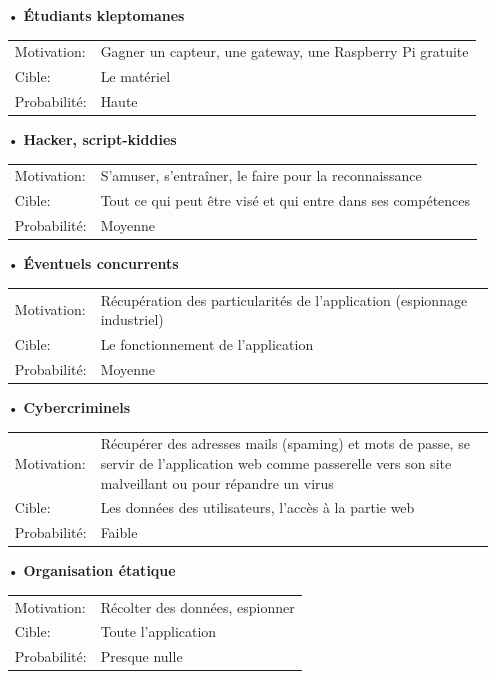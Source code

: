 \documentclass[12pt]{article}
\begin{document}
\begin{itemize}

\item[•] \textbf{Étudiants kleptomanes}

\begin{tabular}{lp{13cm}}
Motivation: & Gagner un capteur, une gateway, une Raspberry Pi gratuite \\
Cible: & Le matériel \\
Probabilité: & Haute \\
\end{tabular}
\medskip

\item[•] \textbf{Hacker, script-kiddies}

\begin{tabular}{lp{13cm}}
Motivation: & S'amuser, s'entraîner, le faire pour la reconnaissance \\
Cible: & Tout ce qui peut être visé et qui entre dans ses compétences \\
Probabilité: & Moyenne \\
\end{tabular}
\medskip

\item[•] \textbf{Éventuels concurrents}

\begin{tabular}{lp{13cm}}
Motivation: & Récupération des particularités de l'application (espionnage industriel) \\
Cible: & Le fonctionnement de l'application \\
Probabilité: & Moyenne \\
\end{tabular}
\medskip

\item[•] \textbf{Cybercriminels}

\begin{tabular}{lp{13cm}}
Motivation: & Récupérer des adresses mails (spaming) et mots de passe, se servir de l'application web comme passerelle vers son site malveillant ou pour répandre un virus \\
Cible: & Les données des utilisateurs, l'accès à la partie web \\
Probabilité: & Faible \\
\end{tabular}
\medskip

\item[•] \textbf{Organisation étatique}

\begin{tabular}{lp{13cm}}
Motivation: & Récolter des données, espionner \\
Cible: & Toute l'application \\
Probabilité: & Presque nulle \\
\end{tabular}
\medskip

\end{itemize}
\end{document}
